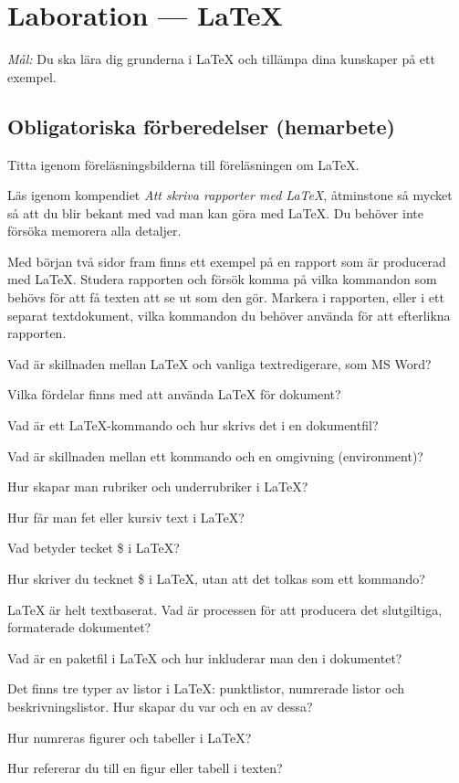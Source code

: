 
\section{Laboration  --- \LaTeX}

\emph{Mål:} Du ska lära dig grunderna i {\LaTeX} och tillämpa dina kunskaper på ett exempel.


\subsection*{Obligatoriska förberedelser (hemarbete)}
\begin{Hemarbete}\firmlist
	\item Titta igenom föreläsningsbilderna till föreläsningen om \LaTeX.
	\item Läs igenom kompendiet \emph{Att skriva rapporter med \LaTeX}, åtminstone så mycket så att du blir bekant med vad man kan göra med \LaTeX. Du behöver inte försöka memorera alla detaljer.
	\item \label{hem:latexuppg} Med början två sidor fram finns ett exempel på en rapport som är producerad med \LaTeX. Studera rapporten och försök komma på vilka kommandon som behövs för att få texten att se ut som den gör. Markera i rapporten, eller i ett separat textdokument, vilka kommandon du behöver använda för att efterlikna rapporten.
\end{Hemarbete}

\begin{Kontrollfragor}
	\item Vad är skillnaden mellan {\LaTeX} och vanliga textredigerare, som MS Word?
	\item Vilka fördelar finns med att använda {\LaTeX} för dokument?
	\item Vad är ett {\LaTeX}-kommando och hur skrivs det i en dokumentfil?
	\item Vad är skillnaden mellan ett kommando och en omgivning (environment)?
	\item Hur skapar man rubriker och underrubriker i {\LaTeX}?
	\item Hur får man fet eller kursiv text i {\LaTeX}?
	\item Vad betyder tecket \$ i {\LaTeX}?
	\item Hur skriver du tecknet \$ i {\LaTeX}, utan att det tolkas som ett kommando?
	\item {\LaTeX} är helt textbaserat. Vad är processen för att producera det slutgiltiga, formaterade dokumentet?
	\item Vad är en paketfil i {\LaTeX} och hur inkluderar man den i dokumentet?
	\item Det finns tre typer av listor i {\LaTeX}: punktlistor, numrerade listor och beskrivningslistor. Hur skapar du var och en av dessa?
	\item Hur numreras figurer och tabeller i {\LaTeX}?
	\item Hur refererar du till en figur eller tabell i texten?

\end{Kontrollfragor}

